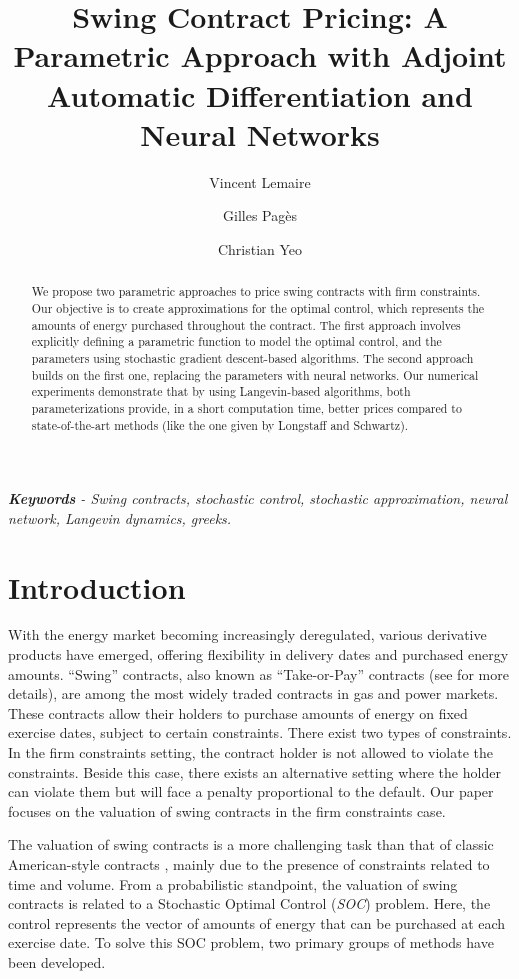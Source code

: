 \documentclass{article}
\title{Swing Contract Pricing: A Parametric Approach with Adjoint Automatic Differentiation and Neural Networks}
\author[1]{Vincent Lemaire}
\author[1]{Gilles Pagès}
\author[1,2]{Christian Yeo}
\affil[1]{\footnotesize Sorbonne Université, Laboratoire de Probabilités, Statistique et Modélisation, UMR 8001, case 158, 4, pl. Jussieu,
F-75252 Paris Cedex 5, France}
\affil[2]{\footnotesize Engie Global Markets, 1 place Samuel Champlain, 92400 Courbevoie, France}
\date{}
\newcommand{\q}[1]{``#1''}
\renewcommand{\q}[1]{``#1''}
\numberwithin{equation}{section}
\begin{document}
\maketitle

\begin{abstract}
    We propose two parametric approaches to price swing contracts with firm constraints. Our objective is to create approximations for the optimal control, which represents the amounts of energy purchased throughout the contract. The first approach involves explicitly defining a parametric function to model the optimal control, and the parameters using stochastic gradient descent-based algorithms. The second approach builds on the first one, replacing the parameters with neural networks. Our numerical experiments demonstrate that by using Langevin-based algorithms, both parameterizations provide, in a short computation time, better prices compared to state-of-the-art methods (like the one given by Longstaff and Schwartz).
\end{abstract}

\textit{\textbf{Keywords} - Swing contracts, stochastic control, stochastic approximation, neural network, Langevin dynamics, greeks.}


\vspace{0.6cm}


\section*{Introduction}
\indent

With the energy market becoming increasingly deregulated, various derivative products have emerged, offering flexibility in delivery dates and purchased energy amounts. \q{Swing} contracts, also known as \q{Take-or-Pay} contracts (see \cite{Thompson1995ValuationOP} for more details), are among the most widely traded contracts in gas and power markets. These contracts allow their holders to purchase amounts of energy on fixed exercise dates, subject to certain constraints. There exist two types of constraints. In the firm constraints setting, the contract holder is not allowed to violate the constraints. Beside this case, there exists an alternative setting where the holder can violate them but will face a penalty proportional to the default. Our paper focuses on the valuation of swing contracts in the firm constraints case.


The valuation of swing contracts is a more challenging task than that of classic American-style contracts \cite{Broadie2004ASM, Jaillet1990VariationalIA, Longstaff2001ValuingAO, Rogers2002MonteCV}, mainly due to the presence of constraints related to time and volume. From a probabilistic standpoint, the valuation of swing contracts is related to a Stochastic Optimal Control (\textit{SOC}) problem. Here, the control represents the vector of amounts of energy that can be purchased at each exercise date. To solve this SOC problem, two primary groups of methods have been developed.
\end{document}

